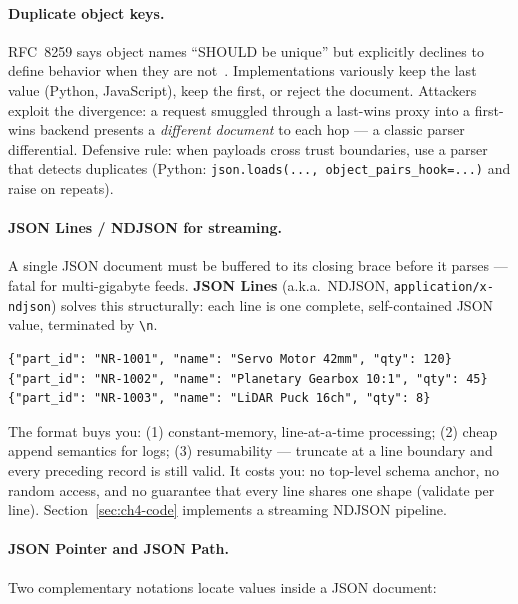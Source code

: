 \paragraph{Duplicate object keys.}
RFC~8259 says object names ``SHOULD be unique'' but explicitly declines to define
behavior when they are not~\cite{rfc8259}. Implementations variously keep the last
value (Python, JavaScript), keep the first, or reject the document. Attackers exploit
the divergence: a request smuggled through a last-wins proxy into a first-wins
backend presents a \emph{different document} to each hop --- a classic parser
differential. Defensive rule: when payloads cross trust boundaries, use a parser that
detects duplicates (Python: \texttt{json.loads(..., object\_pairs\_hook=...)} and
raise on repeats).

\paragraph{JSON Lines / NDJSON for streaming.}
A single JSON document must be buffered to its closing brace before it parses ---
fatal for multi-gigabyte feeds. \textbf{JSON Lines} (a.k.a.\ NDJSON,
\texttt{application/x-ndjson}) solves this structurally: each line is one complete,
self-contained JSON value, terminated by \texttt{\textbackslash n}.

\begin{verbatim}
{"part_id": "NR-1001", "name": "Servo Motor 42mm", "qty": 120}
{"part_id": "NR-1002", "name": "Planetary Gearbox 10:1", "qty": 45}
{"part_id": "NR-1003", "name": "LiDAR Puck 16ch", "qty": 8}
\end{verbatim}

The format buys you: (1) constant-memory, line-at-a-time processing; (2) cheap
append semantics for logs; (3) resumability --- truncate at a line boundary and every
preceding record is still valid. It costs you: no top-level schema anchor, no random
access, and no guarantee that every line shares one shape (validate per line).
Section~\ref{sec:ch4-code} implements a streaming NDJSON pipeline.

\paragraph{JSON Pointer and JSON Path.}
Two complementary notations locate values inside a JSON document:

